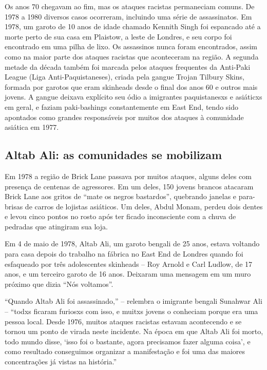 Os anos 70 chegavam ao fim, mas os ataques racistas permaneciam comuns. De 1978 a 1980 diversos casos ocorreram, incluindo uma série de assassinatos. Em 1978, um garoto de 10 anos de idade chamado Kennith Singh foi espancado até a morte perto de sua casa em Plaistow, a leste de Londres, e seu corpo foi encontrado em uma pilha de lixo. Os assassinos nunca foram encontrados, assim como na maior parte dos ataques racistas que aconteceram na região. A segunda metade da década também foi marcada pelos ataques frequentes da Anti-Paki League (Liga Anti-Paquistaneses), criada pela gangue Trojan Tilbury Skins, formada por garotos que eram skinheads desde o final dos anos 60 e outros mais jovens. A gangue deixava explícito seu ódio a imigrantes paquistanesxs e asiáticxs em geral, e faziam paki-bashings constantemente em East End, tendo sido apontados como grandes responsáveis por muitos dos ataques à comunidade asiática em 1977.


\subsection{Altab Ali: as comunidades se mobilizam}

Em 1978 a região de Brick Lane passava por muitos ataques, alguns deles com presença de centenas de agressores. Em um deles, 150 jovens brancos atacaram Brick Lane aos gritos de “mate os negros bastardos”, quebrando janelas e para-brisas de carros de lojistas asiáticos. Um deles, Abdul Monam, perdeu dois dentes e levou cinco pontos no rosto após ter ficado inconsciente com a chuva de pedradas que atingiram sua loja.

Em 4 de maio de 1978, Altab Ali, um garoto bengali de 25 anos, estava voltando para casa depois do trabalho na fábrica no East End de Londres quando foi esfaqueado por três adolescentes skinheads – Roy Arnold e Carl Ludlow, de 17 anos, e um terceiro garoto de 16 anos. Deixaram uma mensagem em um muro próximo que dizia “Nós voltamos”.

“Quando Altab Ali foi assassinado,” – relembra o imigrante bengali Sunahwar Ali – “todxs ficaram furiosxs com isso, e muitxs jovens o conheciam porque era uma pessoa local. Desde 1976, muitos ataques racistas estavam acontecendo e se tornou um ponto de virada neste incidente. Na época em que Altab Ali foi morto, todo mundo disse, ‘isso foi o bastante, agora precisamos fazer alguma coisa’, e como resultado conseguimos organizar a manifestação e foi uma das maiores concentrações já vistas na história.”

